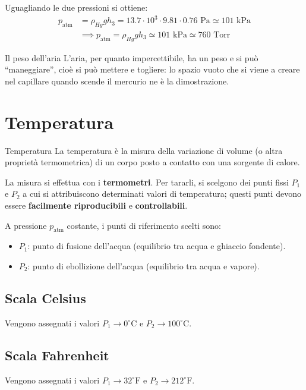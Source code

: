 Uguagliando le due pressioni si ottiene:
\begin{align*}
p_{\text{atm}} &= \rho_{Hg} g h_3 = 13.7 \cdot 10^3 \cdot 9.81 \cdot 0.76 \text{ Pa} \simeq 101 \text{ kPa} \\
&\implies \boxed{p_{\text{atm}} = \rho_{Hg} g h_3 \simeq 101 \text{ kPa} \simeq 760 \text{ Torr}}
\end{align*}

\begin{osservazione}{Il peso dell'aria}
L'aria, per quanto impercettibile, ha un peso e si può ``maneggiare'', cioè si può mettere e togliere: lo spazio vuoto che si viene a creare nel capillare quando scende il mercurio ne è la dimostrazione.
\end{osservazione}


\section{Temperatura}
\begin{definizione}{Temperatura}
La temperatura è la misura della variazione di volume (o altra proprietà termometrica) di un corpo posto a contatto con una sorgente di calore.
\end{definizione}

\medskip
La misura si effettua con i \textbf{termometri}. Per tararli, si scelgono dei punti fissi $P_1$ e $P_2$ a cui si attribuiscono determinati valori di temperatura; questi punti devono essere \textbf{facilmente riproducibili} e \textbf{controllabili}.

A pressione $p_{\text{atm}}$ costante, i punti di riferimento scelti sono:
\begin{itemize}
    \item $P_1$: punto di fusione dell'acqua (equilibrio tra acqua e ghiaccio fondente).
    \item $P_2$: punto di ebollizione dell'acqua (equilibrio tra acqua e vapore).
\end{itemize}

\subsection{Scala Celsius}
Vengono assegnati i valori $P_1 \to 0^\circ\text{C}$ e $P_2 \to 100^\circ\text{C}$.

\subsection{Scala Fahrenheit}
Vengono assegnati i valori $P_1 \to 32^\circ\text{F}$ e $P_2 \to 212^\circ\text{F}$.

